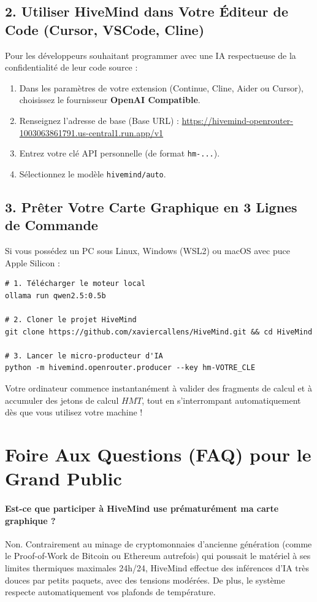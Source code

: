 \documentclass[11pt,a4paper]{article}
\begin{document}
\subsection{2. Utiliser HiveMind dans Votre Éditeur de Code (Cursor, VSCode, Cline)}
Pour les développeurs souhaitant programmer avec une IA respectueuse de la confidentialité de leur code source :
\begin{enumerate}[leftmargin=1.8em]
    \item Dans les paramètres de votre extension (Continue, Cline, Aider ou Cursor), choisissez le fournisseur \textbf{OpenAI Compatible}.
    \item Renseignez l'adresse de base (Base URL) : \url{https://hivemind-openrouter-1003063861791.us-central1.run.app/v1}
    \item Entrez votre clé API personnelle (de format \texttt{hm-...}).
    \item Sélectionnez le modèle \texttt{hivemind/auto}.
\end{enumerate}

\subsection{3. Prêter Votre Carte Graphique en 3 Lignes de Commande}
Si vous possédez un PC sous Linux, Windows (WSL2) ou macOS avec puce Apple Silicon :
\begin{verbatim}
# 1. Télécharger le moteur local
ollama run qwen2.5:0.5b

# 2. Cloner le projet HiveMind
git clone https://github.com/xaviercallens/HiveMind.git && cd HiveMind

# 3. Lancer le micro-producteur d'IA
python -m hivemind.openrouter.producer --key hm-VOTRE_CLE
\end{verbatim}
Votre ordinateur commence instantanément à valider des fragments de calcul et à accumuler des jetons de calcul $HMT$, tout en s'interrompant automatiquement dès que vous utilisez votre machine !

\section{Foire Aux Questions (FAQ) pour le Grand Public}

\paragraph{Est-ce que participer à HiveMind use prématurément ma carte graphique ?}
Non. Contrairement au minage de cryptomonnaies d'ancienne génération (comme le Proof-of-Work de Bitcoin ou Ethereum autrefois) qui poussait le matériel à ses limites thermiques maximales 24h/24, HiveMind effectue des inférences d'IA très douces par petits paquets, avec des tensions modérées. De plus, le système respecte automatiquement vos plafonds de température.
\end{document}
